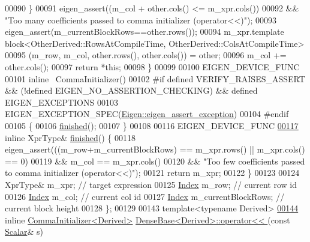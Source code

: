 \begin{DoxyCode}
00090     \}
00091     eigen\_assert((m\_col + other.cols() <= m\_xpr.cols())
00092       && \textcolor{stringliteral}{"Too many coefficients passed to comma initializer (operator<<)"});
00093     eigen\_assert(m\_currentBlockRows==other.rows());
00094     m\_xpr.template block<OtherDerived::RowsAtCompileTime, OtherDerived::ColsAtCompileTime>
00095                     (m\_row, m\_col, other.rows(), other.cols()) = other;
00096     m\_col += other.cols();
00097     \textcolor{keywordflow}{return} *\textcolor{keyword}{this};
00098   \}
00099 
00100   EIGEN\_DEVICE\_FUNC
00101   \textcolor{keyword}{inline} ~CommaInitializer()
00102 \textcolor{preprocessor}{#if defined VERIFY\_RAISES\_ASSERT && (!defined EIGEN\_NO\_ASSERTION\_CHECKING) && defined EIGEN\_EXCEPTIONS}
00103   EIGEN\_EXCEPTION\_SPEC(\hyperlink{struct_eigen_1_1eigen__assert__exception}{Eigen::eigen\_assert\_exception})
00104 \textcolor{preprocessor}{#endif}
00105   \{
00106       \hyperlink{group___core___module_a3be7de7fb3e8d3c4d3063f480181b17f}{finished}();
00107   \}
00108 
00116   EIGEN\_DEVICE\_FUNC
\hyperlink{group___core___module_a3be7de7fb3e8d3c4d3063f480181b17f}{00117}   \textcolor{keyword}{inline} XprType& \hyperlink{group___core___module_a3be7de7fb3e8d3c4d3063f480181b17f}{finished}() \{
00118       eigen\_assert(((m\_row+m\_currentBlockRows) == m\_xpr.rows() || m\_xpr.cols() == 0)
00119            && m\_col == m\_xpr.cols()
00120            && \textcolor{stringliteral}{"Too few coefficients passed to comma initializer (operator<<)"});
00121       \textcolor{keywordflow}{return} m\_xpr;
00122   \}
00123 
00124   XprType& m\_xpr;           \textcolor{comment}{// target expression}
00125   \hyperlink{namespace_eigen_a62e77e0933482dafde8fe197d9a2cfde}{Index} m\_row;              \textcolor{comment}{// current row id}
00126   \hyperlink{namespace_eigen_a62e77e0933482dafde8fe197d9a2cfde}{Index} m\_col;              \textcolor{comment}{// current col id}
00127   \hyperlink{namespace_eigen_a62e77e0933482dafde8fe197d9a2cfde}{Index} m\_currentBlockRows; \textcolor{comment}{// current block height}
00128 \};
00129 
00143 \textcolor{keyword}{template}<\textcolor{keyword}{typename} Derived>
\hyperlink{group___core___module_a0e575eb0ba6cc6bc5f347872abd8509d}{00144} \textcolor{keyword}{inline} \hyperlink{group___core___module_struct_eigen_1_1_comma_initializer}{CommaInitializer<Derived>} 
      \hyperlink{group___core___module_a0e575eb0ba6cc6bc5f347872abd8509d}{DenseBase<Derived>::operator<< }(\textcolor{keyword}{const} \hyperlink{group___core___module_a5feed465b3a8e60c47e73ecce83e39a2}{Scalar}& s)

\end{DoxyCode}
